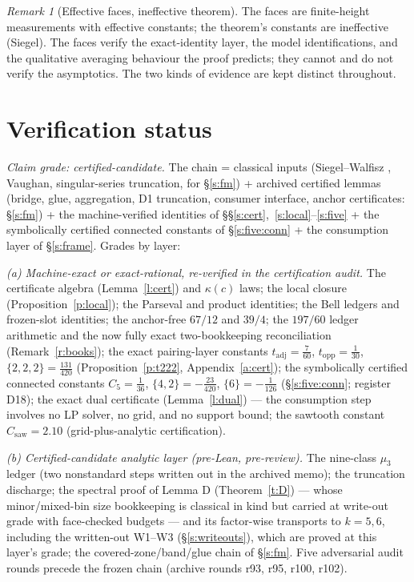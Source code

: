 \documentclass[11pt]{article}
\numberwithin{equation}{section}
\theoremstyle{definition}
\theoremstyle{remark}
\newtheorem{remark}[theorem]{Remark}
\begin{document}
\begin{remark}[Effective faces, ineffective theorem]
The faces are finite-height measurements with effective
constants; the theorem's constants are ineffective (Siegel). The
faces verify the exact-identity layer, the model identifications,
and the qualitative averaging behaviour the proof predicts; they
cannot and do not verify the asymptotics. The two kinds of
evidence are kept distinct throughout.
\end{remark}

\section{Verification status}\label{s:verif}

\emph{Claim grade: certified-candidate.} The chain = classical
inputs (Siegel--Walfisz \cite{Dav,IK}, Vaughan, singular-series
truncation, \cite{MRT} for \S\ref{s:fm}) + archived certified
lemmas (bridge, glue, aggregation, D1 truncation, consumer
interface, anchor certificates: \S\ref{s:fm}) + the
machine-verified identities of
\S\S\ref{s:cert},~\ref{s:local}--\ref{s:five} + the
symbolically certified connected constants of
\S\ref{s:five:conn} + the
consumption layer of \S\ref{s:frame}. Grades by layer:

\emph{(a) Machine-exact or exact-rational, re-verified in the
certification audit.} The certificate algebra (Lemma~\ref{l:cert}) and
$\kappa(c)$ laws; the local closure
(Proposition~\ref{p:local}); the Parseval and product identities;
the Bell ledgers and frozen-slot identities; the anchor-free
$67/12$ and $39/4$; the $197/60$ ledger arithmetic and the now
fully exact two-bookkeeping reconciliation
(Remark~\ref{r:books}); the exact pairing-layer constants
$t_{\mathrm{adj}}=\tfrac7{60}$, $t_{\mathrm{opp}}=\tfrac1{30}$,
$\{2,2,2\}=\tfrac{131}{420}$ (Proposition~\ref{p:t222},
Appendix~\ref{a:cert}); the symbolically certified connected
constants $C_5=\tfrac1{36}$, $\{4,2\}=-\tfrac{23}{420}$,
$\{6\}=-\tfrac1{126}$ (\S\ref{s:five:conn}; register D18);
the exact dual certificate
(Lemma~\ref{l:dual}) --- the consumption step involves no LP
solver, no grid, and no support bound; the sawtooth constant
$C_{\mathrm{saw}}=2.10$ (grid-plus-analytic certification).

\emph{(b) Certified-candidate analytic layer (pre-Lean,
pre-review).} The nine-class $\mu_3$ ledger (two nonstandard
steps written out in the archived memo); the truncation
discharge; the spectral proof of Lemma D (Theorem~\ref{t:D}) ---
whose minor/mixed-bin size bookkeeping is classical in kind but
carried at write-out grade with face-checked budgets --- and its
factor-wise transports to $k=5,6$, including the written-out
W1--W3 (\S\ref{s:writeouts}), which are proved at this layer's
grade; the covered-zone/band/glue chain of \S\ref{s:fm}. Five
adversarial audit rounds precede the frozen chain (archive
rounds r93, r95, r100, r102).
\end{document}
